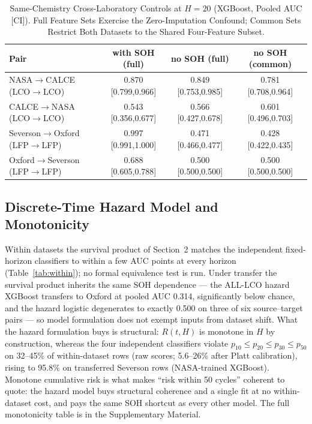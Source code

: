 \documentclass[11pt,a4paper]{article}
\begin{document}
\begin{table}[!t]
\caption{Same-Chemistry Cross-Laboratory Controls at $H{=}20$ (XGBoost, Pooled AUC [CI]). Full Feature Sets Exercise the Zero-Imputation Confound; Common Sets Restrict Both Datasets to the Shared Four-Feature Subset.}
\label{tab:samechem}
\centering
\footnotesize
\begin{tabular}{lccc}
\toprule
\textbf{Pair} & \textbf{with SOH (full)} & \textbf{no SOH (full)} & \textbf{no SOH (common)}\\
\midrule
NASA$\to$CALCE (LCO$\to$LCO) & 0.870 [0.799,0.966] & 0.849 [0.753,0.985] & 0.781 [0.708,0.964] \\
CALCE$\to$NASA (LCO$\to$LCO) & 0.543 [0.356,0.677] & 0.566 [0.427,0.678] & 0.601 [0.496,0.703] \\
Severson$\to$Oxford (LFP$\to$LFP) & 0.997 [0.991,1.000] & 0.471 [0.466,0.477] & 0.428 [0.422,0.435] \\
Oxford$\to$Severson (LFP$\to$LFP) & 0.688 [0.605,0.788] & 0.500 [0.500,0.500] & 0.500 [0.500,0.500] \\
\bottomrule
\end{tabular}
\end{table}

\subsection{Discrete-Time Hazard Model and Monotonicity}
Within datasets the survival product of Section~2 matches the independent fixed-horizon classifiers to within a few AUC points at every horizon (Table~\ref{tab:within}); no formal equivalence test is run. Under transfer the survival product inherits the same SOH dependence --- the ALL-LCO hazard XGBoost transfers to Oxford at pooled AUC 0.314, significantly below chance, and the hazard logistic degenerates to exactly 0.500 on three of six source--target pairs --- so model formulation does not exempt inputs from dataset shift. What the hazard formulation buys is structural: $R(t,H)$ is monotone in $H$ by construction, whereas the four independent classifiers violate $p_{10}\le p_{20}\le p_{30}\le p_{50}$ on 32--45\% of within-dataset rows (raw scores; 5.6--26\% after Platt calibration), rising to 95.8\% on transferred Severson rows (NASA-trained XGBoost). Monotone cumulative risk is what makes ``risk within 50 cycles'' coherent to quote: the hazard model buys structural coherence and a single fit at no within-dataset cost, and pays the same SOH shortcut as every other model. The full monotonicity table is in the Supplementary Material.
\end{document}
